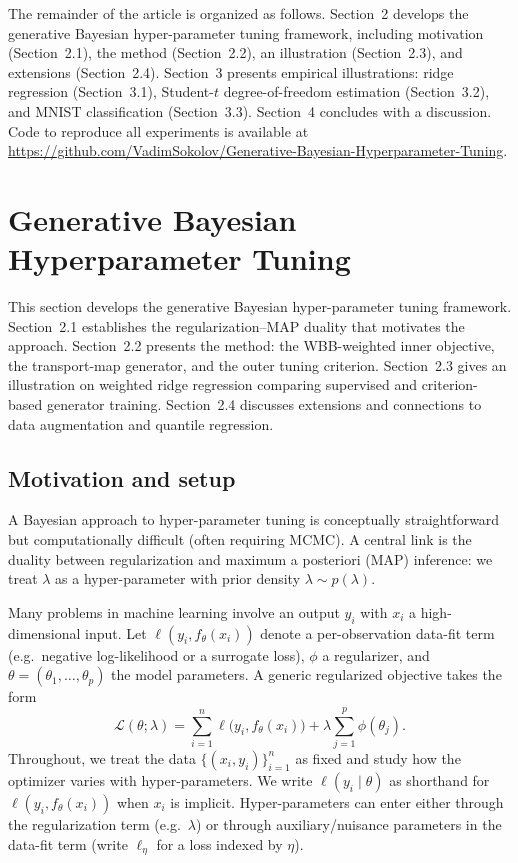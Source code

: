 \documentclass[12pt]{article}
\begin{document}
The remainder of the article is organized as follows. Section~2 develops the generative Bayesian hyper-parameter tuning framework, including motivation (Section~2.1), the method (Section~2.2), an illustration (Section~2.3), and extensions (Section~2.4). Section~3 presents empirical illustrations: ridge regression (Section~3.1), Student-$t$ degree-of-freedom estimation (Section~3.2), and MNIST classification (Section~3.3). Section~4 concludes with a discussion. Code to reproduce all experiments is available at \url{https://github.com/VadimSokolov/Generative-Bayesian-Hyperparameter-Tuning}.

\section{Generative Bayesian Hyperparameter Tuning}

This section develops the generative Bayesian hyper-parameter tuning framework. Section~2.1 establishes the regularization--MAP duality that motivates the approach. Section~2.2 presents the method: the WBB-weighted inner objective, the transport-map generator, and the outer tuning criterion. Section~2.3 gives an illustration on weighted ridge regression comparing supervised and criterion-based generator training. Section~2.4 discusses extensions and connections to data augmentation and quantile regression.

\subsection{Motivation and setup}

A Bayesian approach to hyper-parameter tuning is conceptually straightforward but computationally difficult (often requiring MCMC). A central link is the duality between regularization and maximum a posteriori (MAP) inference: we treat $\lambda$ as a hyper-parameter with prior density $\lambda \sim p(\lambda)$.

Many problems in machine learning involve an output $y_i$ with $x_i$ a high-dimensional input. Let $\ell(y_i, f_\theta(x_i))$ denote a per-observation data-fit term (e.g.\ negative log-likelihood or a surrogate loss), $\phi$ a regularizer, and $\theta=(\theta_1,\ldots,\theta_p)$ the model parameters. A generic regularized objective takes the form
\[
\mathcal{L}(\theta;\lambda)=\sum_{i=1}^n \ell\big(y_i, f_{\theta}(x_i)\big) + \lambda \sum_{j=1}^p \phi(\theta_j).
\]
Throughout, we treat the data $\{(x_i,y_i)\}_{i=1}^n$ as fixed and study how the optimizer varies with hyper-parameters. We write $\ell(y_i \mid \theta)$ as shorthand for $\ell(y_i, f_\theta(x_i))$ when $x_i$ is implicit.
Hyper-parameters can enter either through the regularization term (e.g.\ $\lambda$) or through auxiliary/nuisance parameters in the data-fit term (write $\ell_\eta$ for a loss indexed by $\eta$).
\end{document}
